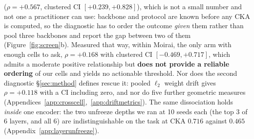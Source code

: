 ($\rho{=}{+}0.567$, clustered CI $[{+}0.239,{+}0.828]$), which is not a small number
and not one a practitioner can use: backbone and protocol are known before any CKA is
computed, so the diagnostic has to order the outcome \emph{given} them rather than
pool three backbones and report the gap between two of them (Figure~\ref{fig:screen}b).
Measured that way, within Moirai, the only arm with enough
cells to ask, $\rho{=}{+}0.168$ with clustered CI $[-0.469,{+}0.717]$, which admits a
moderate positive relationship but \textbf{does not provide a reliable ordering}
of our cells and yields no actionable threshold.  Nor does the
second diagnostic \S\ref{sec:method} defines rescue it: pooled $\ell_2$ weight
drift gives $\rho{=}{+}0.118$ with a CI including zero, and nor do five further
geometric measures
(Appendices~\ref{app:crosscell},~\ref{app:driftmetrics}).  The same dissociation
holds \emph{inside} one encoder: the two unfreeze depths we ran at 10 seeds each
(the top 3 of 6 layers, and all 6) are indistinguishable on the task at CKA
$0.716$ against $0.465$ (Appendix~\ref{app:layerunfreeze}).


